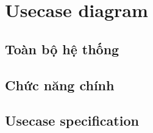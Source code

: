 \section{Usecase diagram}
\subsection{Toàn bộ hệ thống}
\subsection{Chức năng chính}
\subsection{Usecase specification}

\newpage


